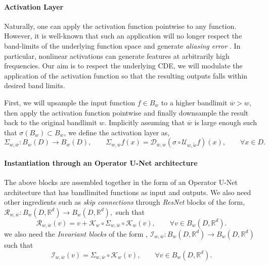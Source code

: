 \documentclass[reqno,10pt]{amsart}
\theoremstyle{plain}
\theoremstyle{definition}
\newcommand{\bb}[1]{\mathbb{#1}}
\newcommand{\cal}[1]{\mathcal{#1}}
\begin{document}
    \paragraph{\bf Activation Layer} Naturally, one can apply the activation function pointwise to any function. However, it is well-known that such an application will no longer respect the band-limits of the underlying function space and generate {\it aliasing error} \cite{FB2023}. In particular, nonlinear activations can generate features at arbitrarily high frequencies. Our aim is to respect the underlying CDE, we will modulate the application of the activation function so that the resulting outputs falls within desired band limits.

    \noindent First, we will upsample the input function $f \in B_w$ to a higher bandlimit $\overline{w} > w$, then apply the activation function pointwise and finally downsample the result back to the original bandlimit $w$. Implicitly assuming that $\overline{w}$ is large enough such that $\sigma(B_w) \subset B_{\overline{w}}$, we define the activation layer as,
    \begin{equation}
        \Sigma_{w,\overline{w}} : B_w(D) \to B_w(D), \qquad \Sigma_{w,\overline{w}} f(x) = \cal D_{\overline{w},w}(\sigma \circ \cal U_{w,\tilde{w}} f)(x), \qquad \forall x\in D.
    \end{equation}

    \paragraph{\bf Instantiation through an Operator U-Net architecture} The above blocks are assembled together in the form of an Operator U-Net architecture that has bandlimited functions as input and outputs. We also need other ingredients such as {\it skip connections} through {\it ResNet} blocks of the form, $\cal R_{w,\overline{w}} : B_w(D,\bb R^d) \to B_w(D,\bb R^d),$ such that
    \begin{equation}
        \cal R_{w,\overline{w}}(v) = v + \cal K_w \circ \Sigma_{w,\overline{w}} \circ \cal K_w(v), \qquad \forall v \in B_w(D,\bb R^d).        
    \end{equation}
    we also need the {\it Invariant blocks} of the form , $\cal I_{w,\overline{w}}:B_w(D,\bb R^d) \to B_w(D,\bb R^d)$ such that 
    \begin{equation}
        \cal I_{w,\overline{w}}(v) = \Sigma_{w,\overline{w}} \circ \cal K_w(v), \qquad \forall v \in B_w(D,\bb R^d).
    \end{equation}
\end{document}
